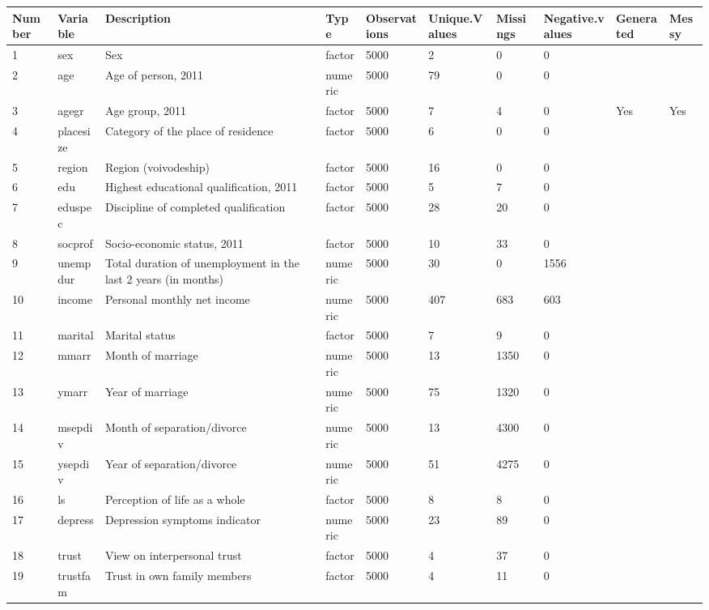 \begin{tabular}{llllllllll}
  \toprule
Number & Variable & Description & Type & Observations & Unique.Values & Missings & Negative.values & Generated & Messy \\ 
  \midrule
  1 & sex & Sex & factor & 5000 & 2 & 0 & 0 &  &  \\ 
    2 & age & Age of person, 2011 & numeric & 5000 & 79 & 0 & 0 &  &  \\ 
    3 & agegr & Age group, 2011 & factor & 5000 & 7 & 4 & 0 & Yes & Yes \\ 
    4 & placesize & Category of the place of residence & factor & 5000 & 6 & 0 & 0 &  &  \\ 
    5 & region & Region (voivodeship) & factor & 5000 & 16 & 0 & 0 &  &  \\ 
    6 & edu & Highest educational qualification, 2011 & factor & 5000 & 5 & 7 & 0 &  &  \\ 
    7 & eduspec & Discipline of completed qualification & factor & 5000 & 28 & 20 & 0 &  &  \\ 
    8 & socprof & Socio-economic status, 2011 & factor & 5000 & 10 & 33 & 0 &  &  \\ 
    9 & unempdur & Total duration of unemployment in the last 2 years (in months) & numeric & 5000 & 30 & 0 & 1556 &  &  \\ 
   10 & income & Personal monthly net income & numeric & 5000 & 407 & 683 & 603 &  &  \\ 
   11 & marital & Marital status & factor & 5000 & 7 & 9 & 0 &  &  \\ 
   12 & mmarr & Month of marriage & numeric & 5000 & 13 & 1350 & 0 &  &  \\ 
   13 & ymarr & Year of marriage & numeric & 5000 & 75 & 1320 & 0 &  &  \\ 
   14 & msepdiv & Month of separation/divorce & numeric & 5000 & 13 & 4300 & 0 &  &  \\ 
   15 & ysepdiv & Year of separation/divorce & numeric & 5000 & 51 & 4275 & 0 &  &  \\ 
   16 & ls & Perception of life as a whole & factor & 5000 & 8 & 8 & 0 &  &  \\ 
   17 & depress & Depression symptoms indicator & numeric & 5000 & 23 & 89 & 0 &  &  \\ 
   18 & trust & View on interpersonal trust & factor & 5000 & 4 & 37 & 0 &  &  \\ 
   19 & trustfam & Trust in own family members & factor & 5000 & 4 & 11 & 0 &  &  \\ 

\end{tabular}
